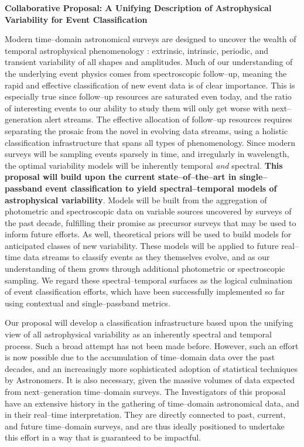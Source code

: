 \centerline{\bf Collaborative Proposal: A Unifying Description of Astrophysical
Variability for Event Classification} \medskip

Modern time--domain astronomical surveys are designed to uncover the wealth of
temporal astrophysical phenomenology : extrinsic, intrinsic, periodic, and
transient variability of all shapes and amplitudes.  Much of our understanding
of the underlying event physics comes from spectroscopic follow--up, meaning the
rapid and effective classification of new event data is of clear importance.
This is especially true since follow--up resources are saturated even today, and
the ratio of interesting events to our ability to study them will only get worse
with next--generation alert streams. The effective allocation of follow--up
resources requires separating the prosaic from the novel in evolving data
streams, using a holistic classification infrastructure that spans all types of
phenomenology. Since modern surveys will be sampling events sparsely in time,
and irregularly in wavelength, the optimal variability models will be inherently
temporal {\it and} spectral.  {\bf This proposal will build upon the current
state--of--the--art in single--passband event classification to yield
spectral--temporal models of astrophysical variability}.  Models will be built
from the aggregation of photometric and spectroscopic data on variable sources
uncovered by surveys of the past decade, fulfilling their promise as precursor
surveys that may be used to inform future efforts.  As well, theoretical priors
will be used to build models for anticipated classes of new variability.  These
models will be applied to future real--time data streams to classify events as
they themselves evolve, and as our understanding of them grows through
additional photometric or spectroscopic sampling.  We regard these
spectral--temporal surfaces as the logical culmination of event classification
efforts, which have been successfully implemented so far using contextual and
single--passband metrics.

\bigskip \centerline{}

Our proposal will develop a classification infrastructure based upon the
unifying view of all astrophysical variability as an inherently spectral and
temporal process.  Such a broad attempt has not been made before. However, such
an effort is now possible due to the accumulation of time--domain data over the
past decades, and an increasingly more sophisticated adoption of statistical
techniques by Astronomers. It is also necessary, given the massive volumes of
data expected from next--generation time--domain surveys. The Investigators of
this proposal have an extensive history in the gathering of time--domain
astronomical data, and in their real--time interpretation.  They are directly
connected to past, current, and future time--domain surveys, and are thus
ideally positioned to undertake this effort in a way that is guaranteed to be
impactful.

